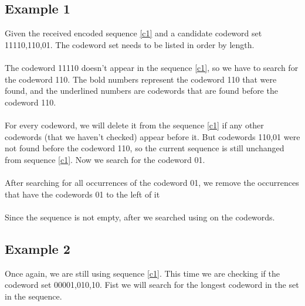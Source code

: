 \documentclass[10pt,letterpaper,notitlepage,draft]{article}
\theoremstyle{definition}
\begin{document}
\subsection{Example 1}

Given the received encoded sequence \ref{c1} and a candidate codeword set {11110,110,01}. The codeword set needs to be listed in order by length.\\

\\

The codeword 11110 doesn't appear in the sequence \ref{c1}, so we have to search for the codeword 110. The bold numbers represent the codeword 110 that were found, and the underlined numbers are codewords that are found before the codeword 110.\\

\\

For every codeword, we will delete it from the sequence \ref{c1} if any other codewords (that we haven't checked) appear before it. But codewords {110,01} were not found before the codeword 110, so the current sequence is still unchanged from sequence \ref{c1}. Now we search for the codeword 01. \\

\\

After searching for all occurrences of the codeword 01, we remove the occurrences that have the codewords {01} to the left of it\\

\\

Since the sequence is not empty, after we searched using on the codewords.

\subsection{Example 2}

Once again, we are still using sequence \ref{c1}. 
This time we are checking if the codeword set {00001,010,10}.
Fist we will search for the longest codeword in the set in the sequence.\\
\end{document}
